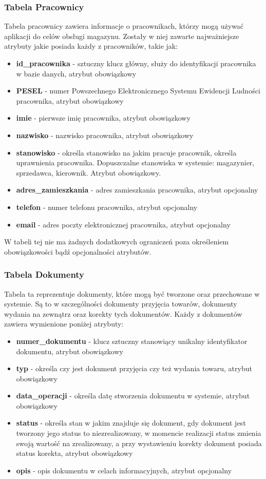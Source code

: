 \subsubsection{Tabela Pracownicy}
Tabela pracownicy zawiera informacje o pracownikach, którzy mogą używać
aplikacji do celów obsługi magazynu. Zostały w niej zawarte najważniejsze atrybuty jakie posiada każdy z
pracowników, takie jak:
\begin{itemize}
  \item \textbf{id\_pracownika} - sztuczny klucz główny, służy do identyfikacji
  pracownika w bazie danych, atrybut obowiązkowy
  \item \textbf{PESEL} - numer Powszechnego Elektronicznego Systemu Ewidencji
  Ludności pracownika, atrybut obowiązkowy
  \item \textbf{imie} - pierwsze imię pracownika, atrybut obowiązkowy
  \item \textbf{nazwisko} - nazwisko pracownika, atrybut obowiązkowy
  \item \textbf{stanowisko} - określa stanowisko na jakim pracuje pracownik,
  określa uprawnienia pracownika. Dopuszczalne stanowiska w systemie: magazynier,
  sprzedawca, kierownik. Atrybut obowiązkowy.
  \item \textbf{adres\_zamieszkania} - adres zamieszkania pracownika, atrybut
  opcjonalny
  \item \textbf{telefon} - numer telefonu pracownika, atrybut opcjonalny
  \item \textbf{email} - adres poczty elektronicznej pracownika, atrybut
  opcjonalny
\end{itemize}

W tabeli tej nie ma żadnych dodatkowych ograniczeń poza określeniem
obowiązkowości bądź opcjonalności atrybutów.

\subsubsection{Tabela Dokumenty}
Tabela ta reprezentuje dokumenty, które mogą być tworzone oraz przechowane w
systemie. Są to w szczególności dokumenty przyjęcia towarów, dokumenty wydania
na zewnątrz oraz korekty tych dokumentów. Każdy z dokumentów zawiera wymienione
poniżej atrybuty:
\begin{itemize}
  \item \textbf{numer\_dokumentu} - klucz sztuczny stanowiący unikalny
  identyfikator dokumentu, atrybut obowiązkowy
  \item \textbf{typ} - określa czy jest dokument przyjęcia czy też wydania
  towaru, atrybut obowiązkowy
  \item \textbf{data\_operacji} - określa datę stworzenia dokumentu w systemie,
  atrybut obowiązkowy
  \item \textbf{status} - określa stan w jakim znajduje się dokument, gdy
  dokument jest tworzony jego status to niezrealizowany, w momencie realizacji
  status zmienia swoją wartość na zrealizowany, a przy wystawieniu korekty
  dokument posiada status korekta, atrybut obowiązkowy
  \item \textbf{opis} - opis dokumentu w celach informacyjnych, atrybut
  opcjonalny
\end{itemize}

